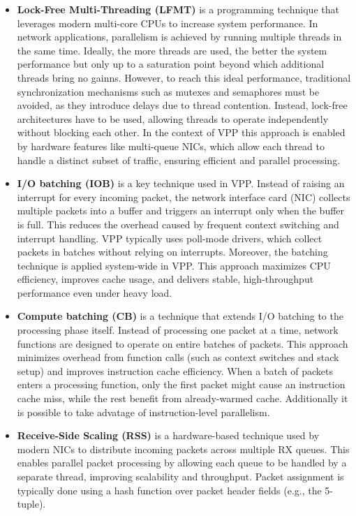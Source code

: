 \begin{itemize}
  \item \textbf{Lock-Free Multi-Threading (LFMT)}
is a programming technique that leverages modern multi-core CPUs to increase system performance. In network applications, parallelism is achieved by running multiple threads in the same time. 
Ideally, the more threads are used, the better the system performance but only up to a saturation point beyond which additional threads bring no gainns. 
However, to reach this ideal performance, traditional synchronization mechanisms such as mutexes and semaphores must be avoided, as they introduce delays due to thread contention. 
Instead, lock-free architectures have to be used, allowing threads to operate independently without blocking each other. 
In the context of VPP this approach is enabled by hardware features like multi-queue NICs, 
which allow each thread to handle a distinct subset of traffic, ensuring efficient and parallel processing.

  \item \textbf{I/O batching (IOB)}
is a key technique used in VPP. 
Instead of raising an interrupt for every incoming packet, the network interface card (NIC) collects multiple packets into a buffer and triggers an interrupt only when the buffer is full. 
This reduces the overhead caused by frequent context switching and interrupt handling. 
VPP typically uses poll-mode drivers, which collect packets in batches without relying on interrupts. 
Moreover, the batching technique is applied system-wide in VPP. This approach maximizes CPU efficiency, improves cache usage, and delivers stable, high-throughput performance even under heavy load.

  \item \textbf{Compute batching (CB)} 
is a technique that extends I/O batching to the processing phase itself. 
Instead of processing one packet at a time, network functions are designed to operate on entire batches of packets. 
This approach minimizes overhead from function calls (such as context switches and stack setup) and improves instruction cache efficiency. 
When a batch of packets enters a processing function, only the first packet might cause an instruction cache miss, while the rest benefit from already-warmed cache.
Additionally it is possible to take advatage of instruction-level parallelism.
  
  \item \textbf{Receive-Side Scaling (RSS)}
is a hardware-based technique used by modern NICs to distribute incoming packets across multiple RX queues. 
This enables parallel packet processing by allowing each queue to be handled by a separate thread, improving scalability and throughput. 
Packet assignment is typically done using a hash function over packet header fields (e.g., the 5-tuple). 


\end{itemize}
